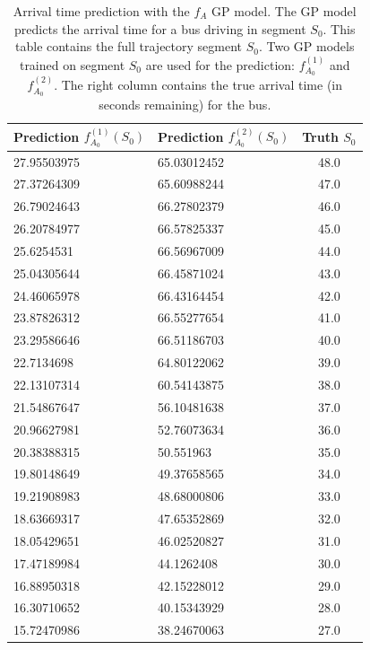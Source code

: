 \begin{table}
    \centering
    \caption[Arrival time prediction with the $f_A$ GP model]%
    {{\small Arrival time prediction with the $f_A$ GP model.
    The GP model predicts the arrival time for a bus driving in segment $S_0$.
    This table contains the full trajectory segment $S_0$.
    Two GP models trained on segment $S_0$ are used for the prediction: $f^{(1)}_{A_0}$ and $f^{(2)}_{A_0}$.
    The right column contains the true arrival time (in seconds remaining) for the bus.}}
    \label{table:f_A-examples} 
    \begin{tabular}{ |l|l|c| } 
        \hline
        Prediction $f^{(1)}_{A_0}(S_0)$ & Prediction $f^{(2)}_{A_0}(S_0)$ & Truth $S_0$ \\ [0.5ex] 
        \hline
        27.95503975 & 65.03012452 & 48.0 \\
        27.37264309 & 65.60988244 & 47.0 \\
        26.79024643 & 66.27802379 & 46.0 \\
        26.20784977 & 66.57825337 & 45.0 \\
        25.6254531 & 66.56967009 & 44.0 \\
        25.04305644 & 66.45871024 & 43.0 \\
        24.46065978 & 66.43164454 & 42.0 \\
        23.87826312 & 66.55277654 & 41.0 \\
        23.29586646 & 66.51186703 & 40.0 \\
        22.7134698 & 64.80122062 & 39.0 \\
        22.13107314 & 60.54143875 & 38.0 \\
        21.54867647 & 56.10481638 & 37.0 \\
        20.96627981 & 52.76073634 & 36.0 \\
        20.38388315 & 50.551963 & 35.0 \\
        19.80148649 & 49.37658565 & 34.0 \\
        19.21908983 & 48.68000806 & 33.0 \\
        18.63669317 & 47.65352869 & 32.0 \\
        18.05429651 & 46.02520827 & 31.0 \\
        17.47189984 & 44.1262408 & 30.0 \\
        16.88950318 & 42.15228012 & 29.0 \\
        16.30710652 & 40.15343929 & 28.0 \\
        15.72470986 & 38.24670063 & 27.0 \\

\end{tabular}
\end{table}
